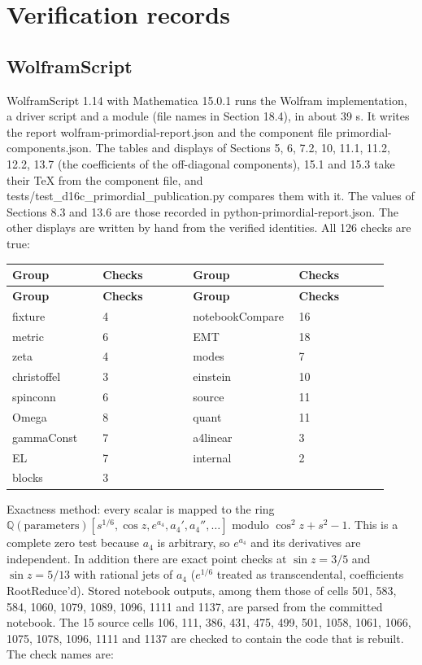 \documentclass[11pt]{article}
\begin{document}
\section{Verification records}

\subsection{WolframScript}

WolframScript 1.14 with Mathematica 15.0.1 runs the Wolfram implementation, a driver script and a module (file names in Section 18.4), in about 39 s. It writes the report wolfram-primordial-report.json and the component file primordial-components.json. The tables and displays of Sections 5, 6, 7.2, 10, 11.1, 11.2, 12.2, 13.7 (the coefficients of the off-diagonal components), 15.1 and 15.3 take their TeX from the component file, and tests/test\_d16c\_primordial\_publication.py compares them with it. The values of Sections 8.3 and 13.6 are those recorded in python-primordial-report.json. The other displays are written by hand from the verified identities. All 126 checks are true:

\begin{longtable}{@{}p{0.230\linewidth}p{0.230\linewidth}p{0.230\linewidth}p{0.230\linewidth}@{}}
\toprule
\textbf{Group} & \textbf{Checks} & \textbf{Group} & \textbf{Checks} \\
\midrule
\endfirsthead
\toprule
\textbf{Group} & \textbf{Checks} & \textbf{Group} & \textbf{Checks} \\
\midrule
\endhead
fixture & 4 & notebookCompare & 16 \\
metric & 6 & EMT & 18 \\
zeta & 4 & modes & 7 \\
christoffel & 3 & einstein & 10 \\
spinconn & 6 & source & 11 \\
Omega & 8 & quant & 11 \\
gammaConst & 7 & a4linear & 3 \\
EL & 7 & internal & 2 \\
blocks & 3 &  &  \\
\bottomrule
\end{longtable}

Exactness method: every scalar is mapped to the ring $\mathbb Q(\text{parameters})[s^{1/6},\cos z,e^{a_4},a_4',a_4'',\dots]$ modulo $\cos^2z+s^2-1$. This is a complete zero test because $a_4$ is arbitrary, so $e^{a_4}$ and its derivatives are independent. In addition there are exact point checks at $\sin z=3/5$ and $\sin z=5/13$ with rational jets of $a_4$ ($e^{1/6}$ treated as transcendental, coefficients RootReduce'd). Stored notebook outputs, among them those of cells 501, 583, 584, 1060, 1079, 1089, 1096, 1111 and 1137, are parsed from the committed notebook. The 15 source cells 106, 111, 386, 431, 475, 499, 501, 1058, 1061, 1066, 1075, 1078, 1096, 1111 and 1137 are checked to contain the code that is rebuilt. The check names are:
\end{document}
